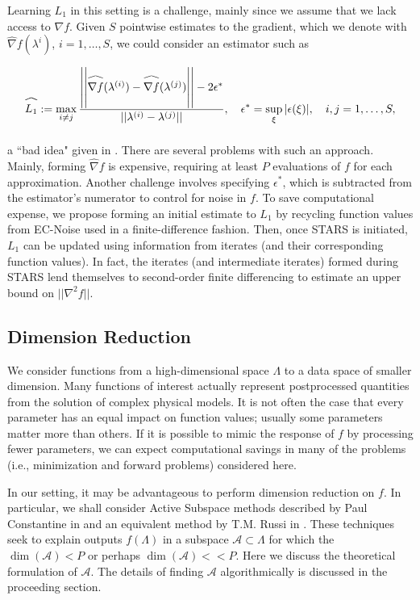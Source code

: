 \documentclass{amsart}
\newcommand{\A}{\mathcal{A}}
\newcommand\reallywidehat[1]{\arraycolsep=0pt\relax%
\begin{array}{c}
\stretchto{
  \scaleto{
    \scalerel*[\widthof{\ensuremath{#1}}]{\kern-.5pt\bigwedge\kern-.5pt}
    {\rule[-\textheight/2]{1ex}{\textheight}} %
  }{\textheight} %
}{0.5ex}\\           %
#1\\                 %
\rule{-1ex}{0ex}
\end{array}
}
\begin{document}
Learning $L_1$ in this setting is a challenge, mainly since we assume that we lack access to $\nabla f$. Given $S$ pointwise estimates to the gradient, which we denote with $\hat{\nabla}f(\lambda^i)$, $i=1,\ldots, S$, we could consider an estimator such as



\begin{equation} \label{eq:3}
\reallywidehat{L_1}:= \max_{i \neq j} \frac{\left|\left|\reallywidehat{\nabla f}(\lambda^{(i)})-\reallywidehat{\nabla f}(\lambda^{(j)})\right|\right|-2\epsilon^*}{||\lambda^{(i)}-\lambda^{(j)}||}, \quad \epsilon^*=\sup_\xi |\epsilon(\xi)|, \quad i,j=1,\ldots, S,
\end{equation} 

\noindent a ``bad idea" given in \cite{Calliess}. There are several problems with such an approach. Mainly, forming $\hat{\nabla} f$ is expensive, requiring at least $P$ evaluations of $f$ for each approximation. Another challenge involves specifying $\epsilon^*$, which is subtracted from the estimator's numerator to control for noise in $f$. To save computational expense, we propose forming an initial estimate to $L_1$ by recycling function values from EC-Noise used in a finite-difference fashion. Then, once STARS is initiated, $L_1$ can be updated using information from iterates (and their corresponding function values). In fact, the iterates (and intermediate iterates) formed during STARS lend themselves to second-order finite differencing to estimate an upper bound on $||\nabla ^2 f||.$





\subsection{Dimension Reduction}
We consider functions from a high-dimensional space $\Lambda$ to a data space of smaller dimension. Many functions of interest %
actually represent postprocessed quantities from the solution of complex physical models. %
It is not often the case that every parameter has an equal impact on function values; usually some parameters matter more than others. If it is possible to mimic the response of $f$ by processing fewer parameters, we can expect computational savings in many of the problems (i.e., minimization and forward problems) considered here.

In our setting, it may be advantageous to perform dimension reduction on $f$. In particular, we shall consider Active Subspace methods described by Paul Constantine in \cite{Constantine2015} and an equivalent method by T.M. Russi in \cite{Russi}. These techniques seek to explain outputs $f(\Lambda)$ in a subspace $\A \subset \Lambda$ for which the $\dim (\A) <P$ or perhaps $\dim(\A)<<P$. Here we discuss the theoretical formulation of $\A$. The details of finding $\A$ algorithmically is discussed in the proceeding section.
\end{document}
